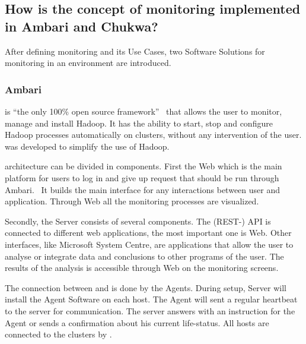 \subsection{How is the concept of monitoring implemented in Ambari and Chukwa?}
\label{subsec:Implementation}
After defining monitoring and its Use Cases, two Software Solutions for monitoring in an \hadoop environment are introduced.

\subsubsection{Ambari}
\amb is ``the only 100\% open source framework''~\cite{Sako2013} that allows the user to monitor, manage and install Hadoop.\cite{ApacheSoftwareFoundation2015} It has the ability to start, stop and configure Hadoop processes automatically on clusters, without any intervention of the user.\cite{Hortonworks2013} \amb was developed to simplify the use of Hadoop.\cite{Hortonworks2013}

\amb architecture can be divided in components. First the \amb Web which is the main platform for users to log in and give up request that should be run through Ambari.~\cite{Sako} It builds the main interface for any interactions between user and application.\cite{Sako} Through \amb Web all the monitoring processes are visualized. 

Secondly, the \amb Server consists of several components.\cite{Sako} The (REST-) API is connected to different web applications, the most important one is \amb Web.\cite{Sako} Other interfaces, like Microsoft System Centre, are applications that allow the user to analyse or integrate data and conclusions to other programs of the user.\cite{Hortonworks2013} The results of the analysis is accessible through \amb Web on the monitoring screens.\cite{Sako}

The connection between \amb and \hadoop is done by the \amb Agents.\cite{Sako} During setup, \amb Server will install the \amb Agent Software on each host. The Agent will sent a regular heartbeat to the server for communication. The server answers with an instruction for the Agent or sends a confirmation about his current life-status.\cite{Sako} All hosts are connected to the clusters by \hadoop.\cite{Sako}

